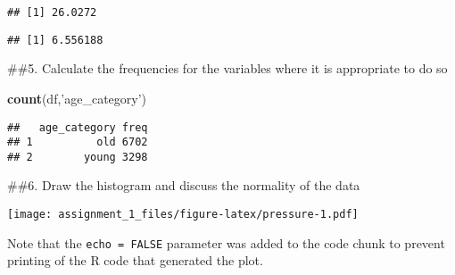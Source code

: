 \documentclass[
]{article}
\newenvironment{Shaded}{\begin{snugshade}}{\end{snugshade}}
\newcommand{\KeywordTok}[1]{\textcolor[rgb]{0.13,0.29,0.53}{\textbf{#1}}}
\newcommand{\NormalTok}[1]{#1}
\newcommand{\OperatorTok}[1]{\textcolor[rgb]{0.81,0.36,0.00}{\textbf{#1}}}
\newcommand{\StringTok}[1]{\textcolor[rgb]{0.31,0.60,0.02}{#1}}
\begin{document}
\begin{verbatim}
## [1] 26.0272
\end{verbatim}

\begin{Shaded}
\end{Shaded}

\begin{verbatim}
## [1] 6.556188
\end{verbatim}

\#\#5. Calculate the frequencies for the variables where it is
appropriate to do so

\begin{Shaded}
\begin{Highlighting}[]
\KeywordTok{count}\NormalTok{(df,}\StringTok{'age_category'}\NormalTok{)}
\end{Highlighting}
\end{Shaded}

\begin{verbatim}
##   age_category freq
## 1          old 6702
## 2        young 3298
\end{verbatim}

\#\#6. Draw the histogram and discuss the normality of the data

\texttt{[image: assignment\_1\_files/figure-latex/pressure-1.pdf]}

Note that the \texttt{echo\ =\ FALSE} parameter was added to the code
chunk to prevent printing of the R code that generated the plot.
\end{document}
